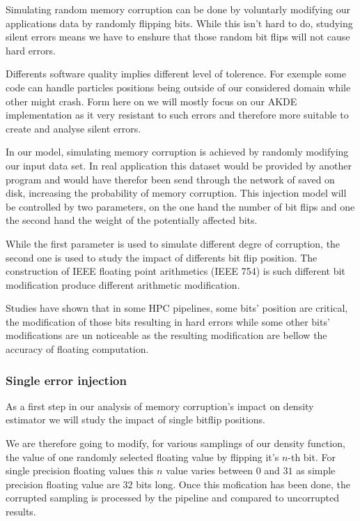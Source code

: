 \documentclass[10pt,a4paper,twoside,twocolumn]{article}
\begin{document}
Simulating random memory corruption can be done by voluntarly modifying our
applications data by randomly flipping bits. While this isn't hard to do,
studying silent errors means we have to enshure that those random bit flips will
not cause hard errors.

Differents software quality implies different level of tolerence. For exemple
some code can handle particles positions being outside of our considered domain
while other might crash. Form here on we will
mostly focus on our AKDE implementation as it very resistant to such errors and
therefore more suitable to create and analyse silent errors.

In our model, simulating memory corruption is achieved by randomly modifying our
input data set. In real application this dataset would be provided by another
program and would have therefor been send through the network of saved on disk,
increasing the probability of memory corruption. This injection model will be
controlled by two parameters, on the one hand the number of bit flips and one
the second hand the weight of the potentially affected bits.

While the first parameter is used to simulate different degre of corruption, the
second one is used to study the impact of differents bit flip position. The
construction of IEEE floating point arithmetics\cite{Kahan1996} (IEEE 754) is
such different bit modification produce different arithmetic modification.

Studies have shown that in some HPC pipelines, some bits' position are critical,
the modification of those bits resulting in hard errors while some other bits' 
modifications are un noticeable as the resulting modification are bellow the
accuracy of floating computation.

\subsubsection{Single error injection}

As a first step in our analysis of memory corruption's impact on density
estimator we will study the impact of single bitflip positions.

We are therefore going to modify, for various samplings of our density function,
the value of one randomly selected floating value by flipping it's $n$-th bit.
For single precision floating values this $n$ value varies between $0$ and $31$
as simple precision floating value are $32$ bits long. Once this mofication has
been done, the corrupted sampling is processed by the pipeline and compared to
uncorrupted results.
\end{document}
